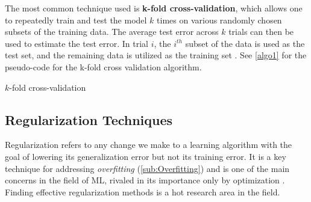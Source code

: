 \documentclass{article}
\begin{document}
The most common technique used is \textbf{k-fold cross-validation}, which allows one to repeatedly train and test the model $k$ times on various randomly chosen subsets of the training data. The average test error across $k$ trials can then be used to estimate the test error. In trial $i$, the $i^{th}$ subset of the data is used as the test set, and the remaining data is utilized as the training set \citep{Goodfellow-et-al-2016}. See \autoref{algo1} for the pseudo-code for the k-fold cross validation algorithm.


\begin{algorithm}[h!]
  \caption{$k$-fold cross-validation}\label{k-CrossVal} 
  \label{algo1}
\end{algorithm}

\subsection{Regularization Techniques}%
  \label{sub:Regularization Techniques}
Regularization refers to any change we make to a learning algorithm with the goal of lowering its generalization error but not its training error. It is a key technique for addressing \textit{overfitting} (\autoref{sub:Overfitting}) and is one of the main concerns in the field of ML, rivaled in its importance only by optimization \citep{Goodfellow-et-al-2016}. Finding effective regularization methods is a hot research area in the field.
\end{document}
